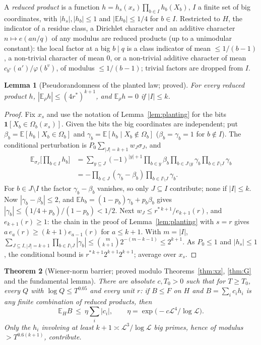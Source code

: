 \documentclass[11pt,reqno]{amsart}
\newtheorem{theorem}{Theorem}[section]
\newtheorem{lemma}[theorem]{Lemma}
\theoremstyle{definition}
\newcommand{\Lc}{\mathcal L}
\newcommand{\E}{\mathbb E}
\begin{document}
A \emph{reduced product} is a function $h=h_s(x_s)\prod_{b\in I}h_b(X_b)$, $I$ a finite
set of big coordinates, with $|h_s|,|h_b|\le1$ and $|\E h_b|\le1/4$ for $b\in I$.
Restricted to $H$, the indicator of a residue class, a Dirichlet character
and an additive character $n\mapsto e(an/q)$ of any modulus are reduced products
(up to a unimodular constant): the local factor at a big $b\mid q$ is a class
indicator of mean $\le1/(b-1)$, a non-trivial character of mean $0$, or a
non-trivial additive character of mean $c_{b^v}(a')/\varphi(b^v)$, of modulus
$\le1/(b-1)$; trivial factors are dropped from $I$.

\begin{lemma}[Pseudorandomness of the planted law; proved]\label{lem:pseudo}
For every reduced product $h$, $|\E_\rho h|\le(4r^*)^{k+1}$, and $\E_\rho h=0$ if $|I|\le k$.
\end{lemma}

\begin{proof}
Fix $x_s$ and use the notation of Lemma~\ref{lem:planting} for the bits
$\mathbf 1[X_b\in\Omega_b(x_s)]$.  Given the bits the big coordinates are independent;
put $\beta_b=\E[h_b\mid X_b\in\Omega_b]$ and $\gamma_b=\E[h_b\mid X_b\notin\Omega_b]$ ($\beta_b=\gamma_b=1$ for
$b\notin I$).  The conditional perturbation is $P_0\sum_{|J|=k+1}w_J\sigma_J$, and
\begin{align*}
 \E_{\sigma_J}\Big[\prod_{b\in I}h_b\Big]&=\sum_{y\subseteq J}(-1)^{|y|+1}\prod_{b\in y}\beta_b\prod_{b\in J\setminus y}\gamma_b\prod_{b\in I\setminus J}\gamma_b\\
 &=-\prod_{b\in J}(\gamma_b-\beta_b)\prod_{b\in I\setminus J}\gamma_b .
\end{align*}
For $b\in J\setminus I$ the factor $\gamma_b-\beta_b$ vanishes, so only $J\subseteq I$
contribute; none if $|I|\le k$.  Now $|\gamma_b-\beta_b|\le2$, and
$\E h_b=(1-p_b)\gamma_b+p_b\beta_b$ gives $|\gamma_b|\le(1/4+p_b)/(1-p_b)<1/2$.  Next
$w_J\le r^{*\,k+1}/e_{k+1}(r)$, and $e_{k+1}(r)\ge1$: the chain in the proof of
Lemma~\ref{lem:planting} with $s=r$ gives $a\,e_a(r)\ge(k+1)e_{a-1}(r)$ for $a\le k+1$.  With
$m=|I|$, $\sum_{J\subseteq I,|J|=k+1}\prod_{b\in I\setminus J}|\gamma_b|\le\binom m{k+1}2^{-(m-k-1)}\le2^{k+1}$.  As
$P_0\le1$ and $|h_s|\le1$, the conditional bound is $r^{*\,k+1}2^{k+1}2^{k+1}$; average over
$x_s$.
\end{proof}

\begin{theorem}[Wiener-norm barrier; proved modulo Theorems~\ref{thm:xz}, \ref{thm:G} and the fundamental lemma]\label{thm:wiener}
There are absolute $c,T_0>0$ such that for $T\ge T_0$, every $Q$ with
$\log Q\le T^{0.05}$ and every unit $r$: if $B\le F$ on $H$ and $B=\sum_ic_ih_i$ is
any finite combination of reduced products, then
\[
 \E_HB\ \le\ \eta\sum_i|c_i|,\qquad \eta=\exp\big(-c\Lc^4/\log\Lc\big).
\]
Only the $h_i$ involving at least $k+1\asymp\Lc^3/\log\Lc$ big primes, hence of modulus
$>T^{0.6(k+1)}$, contribute.
\end{theorem}
\end{document}
